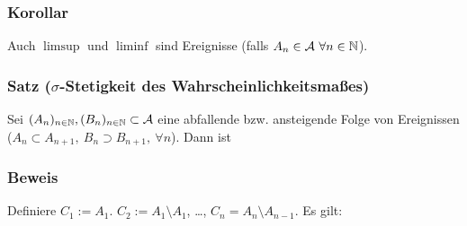 \subsubsection{Korollar}
Auch $\limsup$ und $\liminf$ sind Ereignisse (falls $A_n\in\mathcal{A}\ \forall n\in\mathbb{N}$).
\subsubsection{Satz ($\sigma$-Stetigkeit des Wahrscheinlichkeitsma\ss{}es)}
Sei $(A_n)_{n\in\mathbb{N}},(B_n)_{n\in\mathbb{N}}\subset\mathcal{A}$ eine abfallende bzw. ansteigende Folge von Ereignissen ($A_n\subset A_{n+1},\ B_n\supset B_{n+1},\ \forall n$). Dann ist
\subsubsection{Beweis}
Definiere $C_1:=A_1$. $C_2:=A_1\setminus A_1$, \ldots, $C_n=A_n\setminus A_{n-1}$. Es gilt:
